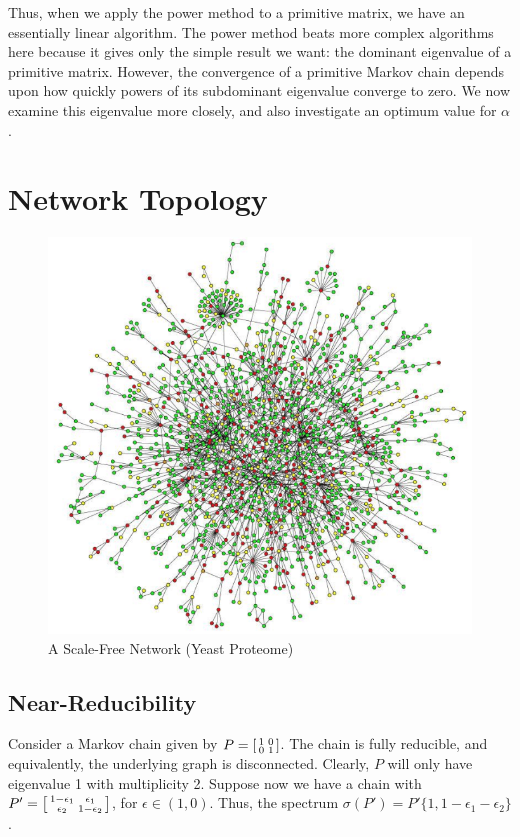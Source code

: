 \documentclass[11pt,letterpaper]{amsart}
\begin{document}
Thus, when we apply the power method to a primitive matrix, we have an
essentially linear algorithm. The power method beats more complex algorithms
here because it gives only the simple result we want: the dominant eigenvalue of
a primitive matrix. However, the convergence of a primitive Markov chain depends
upon how quickly powers of its subdominant eigenvalue converge to zero. We now
examine this eigenvalue more closely, and also investigate an optimum value for
$\alpha$.



\section{Network Topology}
\begin{figure}
  \centering
  \includegraphics[scale=1.8]{scale-free-network}
  \caption{A Scale-Free Network (Yeast Proteome) \cite{wangKineticConformationalCharacterization}}
  \label{fig:scale-free}
\end{figure}


\subsection{Near-Reducibility}
Consider a Markov chain given by
$P=\begin{bsmallmatrix} 1 & 0 \\ 0 & 1 \end{bsmallmatrix}$. The chain is fully
reducible, and equivalently, the underlying graph is disconnected. Clearly, $P$
will only have eigenvalue 1 with multiplicity 2. Suppose now we have a chain
with
$P'=\begin{bsmallmatrix} 1 - \epsilon_1 & \epsilon_1 \\ \epsilon_2 & 1 -
  \epsilon_2 \end{bsmallmatrix}$, for $\epsilon \in (1,0)$. Thus, the spectrum
$\sigma(P') =P' \{ 1, 1-\epsilon_1 - \epsilon_2 \}$.
\end{document}
